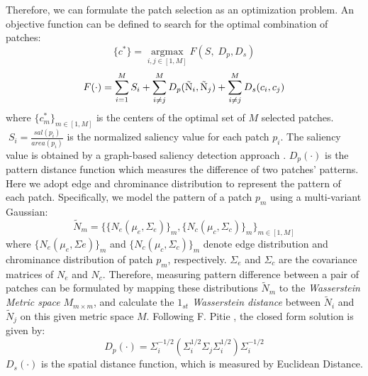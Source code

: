 \documentclass[10pt,twocolumn,letterpaper]{article}
\begin{document}
	Therefore, we can formulate the patch selection as an optimization problem.  An objective function can be defined to search for the optimal combination of patches:
	\begin{equation}
	\{ {c^*}\}  = \mathop {argmax}\limits_{i,j \in [1,M]} F\left( {S,\;{D_p},{D_s}} \right)
	\end{equation}
	\begin{equation}
	F( \cdot ) = \sum\limits_{i = 1}^M {{S_i}}  + \sum\limits_{i \ne j}^M {{D_p}({{{\rm{\tilde N}}}_i},{{{\rm{\tilde N}}}_j}) + \sum\limits_{i \ne j}^M {{D_s}({c_i},{c_j})} }
	\end{equation}
	where ${\{ c_m^ * \} _{m \in [1,M]}}$ is the centers of the optimal set of $M$ selected patches. $\;{S_i} = \frac{{sal({p_i})}}{{area({p_i})}}$ is the normalized saliency value for 
	each patch $p_i$. The saliency value is obtained by a graph-based saliency detection approach \cite{C.Yang:2013:CVPR:graph_based_saliency}.
	${D_p}( \cdot )$ is the pattern distance function which 
	measures the difference of two patches' patterns. 
	Here we adopt edge and chrominance distribution to represent the pattern of each patch. Specifically, we model the pattern of a patch $p_m$ using a multi-variant Gaussian:
	\begin{equation}
	{\tilde N_m} = {\{ {\{ {N_e}({\mu _e},{\Sigma _e})\} _m},{\{ {N_c}({\mu _c},{\Sigma _c})\} _m}\} _{m \in [1,M]}}
	\end{equation}
	where ${\{ {N_e}({\mu _e},{\Sigma e})\} _m}$ and ${\{ {N_c}({\mu _c},{\Sigma _c})\} _m}$ denote edge distribution and chrominance distribution of patch $p_m$, respectively. ${\Sigma _e}$ and ${\Sigma _c}$ are the covariance matrices of $N_e$ and $N_c$. Therefore, measuring pattern difference between a pair of patches can be formulated by mapping these distributions $\tilde N_m$ to the \textit{Wasserstein Metric space} $M_{m \times m}$,  and calculate the \textit{$1_{st}$ Wasserstein distance} between ${\tilde N_i}$ and ${\tilde N_j}$ on this given metric space $M$.
	Following F. Pitie \cite{F.Pitie:2007:color_transfer}, the closed form solution is given by: 
	\begin{equation}
	{D_p}( \cdot ) = \Sigma _i^{ - 1/2}\left( {\Sigma _i^{1/2}{\Sigma _j}\Sigma _i^{1/2}} \right)\Sigma _i^{ - 1/2}
	\end{equation}
	${D_s}( \cdot )$ is the spatial distance function, which is measured by Euclidean Distance.
	
\end{document}
